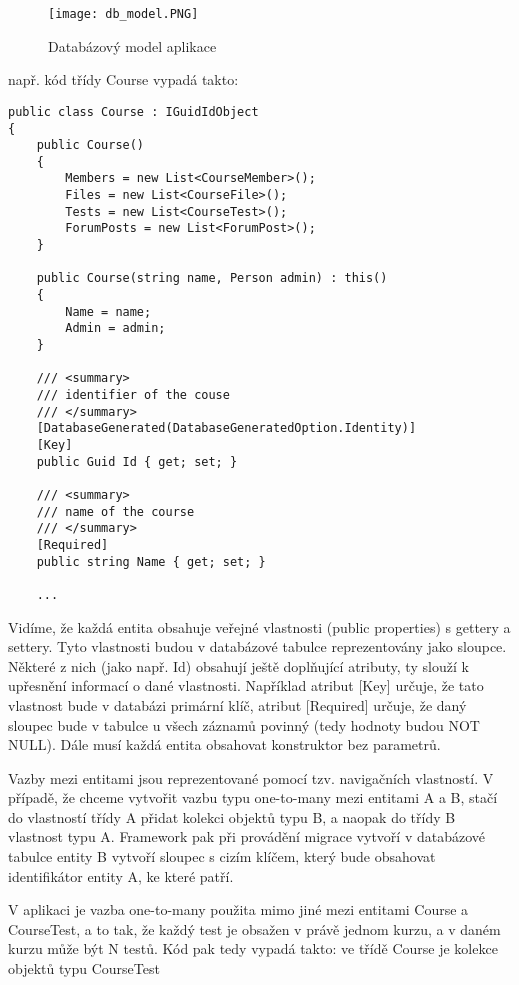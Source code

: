 \newpage

\begin{figure}
	\centering
	\texttt{[image: db\_model.PNG]}
	\caption{Databázový model aplikace}
\end{figure}

\newpage

např. kód třídy Course vypadá takto:

\begin{lstlisting}
public class Course : IGuidIdObject
{
	public Course()
	{
		Members = new List<CourseMember>();
		Files = new List<CourseFile>();
		Tests = new List<CourseTest>();
		ForumPosts = new List<ForumPost>();
	}
	
	public Course(string name, Person admin) : this()
	{
		Name = name;
		Admin = admin;
	}
	
	/// <summary>
	/// identifier of the couse
	/// </summary>
	[DatabaseGenerated(DatabaseGeneratedOption.Identity)]
	[Key]
	public Guid Id { get; set; }
	
	/// <summary>
	/// name of the course
	/// </summary>
	[Required]
	public string Name { get; set; }
	
	...
\end{lstlisting}

Vidíme, že každá entita obsahuje veřejné vlastnosti (public properties) s gettery a settery. Tyto vlastnosti budou v databázové tabulce reprezentovány jako sloupce. Některé z nich (jako např. Id) obsahují ještě doplňující atributy, ty slouží k upřesnění informací o dané vlastnosti. Například atribut [Key] určuje, že tato vlastnost bude v databázi primární klíč, atribut [Required] určuje, že daný sloupec bude v tabulce u všech záznamů povinný (tedy hodnoty budou NOT NULL).
Dále musí každá entita obsahovat konstruktor bez parametrů.

Vazby mezi entitami jsou reprezentované pomocí tzv. navigačních vlastností. V případě, že chceme vytvořit vazbu typu one-to-many mezi entitami A a B, stačí do vlastností třídy A přidat kolekci objektů typu B, a naopak do třídy B vlastnost typu A. Framework pak při provádění migrace vytvoří v databázové tabulce entity B vytvoří sloupec s cizím klíčem, který bude obsahovat identifikátor entity A, ke které patří.

V aplikaci je vazba one-to-many použita mimo jiné mezi entitami Course a CourseTest, a to tak, že každý test je obsažen v právě jednom kurzu, a v daném kurzu může být N testů.
Kód pak tedy vypadá takto: ve třídě Course je kolekce objektů typu CourseTest

